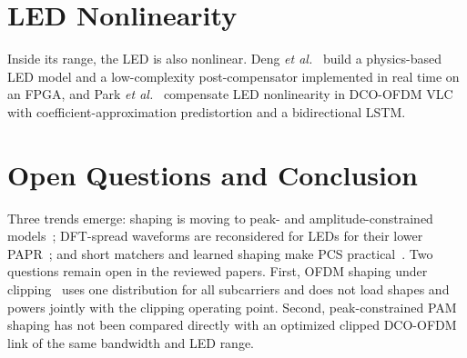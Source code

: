 \documentclass[conference]{IEEEtran}
\begin{document}
\section{LED Nonlinearity}
Inside its range, the LED is also nonlinear. Deng \emph{et al.}~\cite{deng2022} build a physics-based LED model and a low-complexity post-compensator implemented in real time on an FPGA, and Park \emph{et al.}~\cite{park2022} compensate LED nonlinearity in DCO-OFDM VLC with coefficient-approximation predistortion and a bidirectional LSTM.

\section{Open Questions and Conclusion}
Three trends emerge: shaping is moving to peak- and amplitude-constrained models~\cite{wiegart2021,che2021,nguyen2025,liang2025b,gao2025}; DFT-spread waveforms are reconsidered for LEDs for their lower PAPR~\cite{saied2022,saied2023}; and short matchers and learned shaping make PCS practical~\cite{chen2022,matsumine2021,jovanovic2022}. Two questions remain open in the reviewed papers. First, OFDM shaping under clipping~\cite{pham2026} uses one distribution for all subcarriers and does not load shapes and powers jointly with the clipping operating point. Second, peak-constrained PAM shaping has not been compared directly with an optimized clipped DCO-OFDM link of the same bandwidth and LED range.

\makeatletter{}\makeatother

{\scriptsize}
\end{document}

